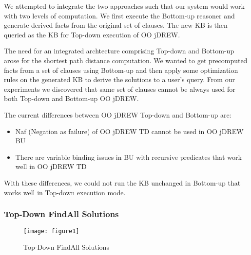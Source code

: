 \hspace{0.3in}We attempted to integrate the two approaches such that our system would work with two levels of computation. We first execute the Bottom-up reasoner and generate derived facts from the original set of clauses. The new KB is then queried as the KB for Top-down execution of OO jDREW.
 
The need for an integrated archtecture comprising Top-down and Bottom-up arose for the shortest path distance computation. We wanted to get precomputed facts from a set of clauses using Bottom-up and then apply some optimization rules on the generated KB to derive the solutions to a user's query. From our experiments we discovered that same set of clauses cannot be always used for both Top-down and Bottom-up OO jDREW.

\hspace{0.3in}The current differences between OO jDREW Top-down and Bottom-up are:
\begin{itemize}
\item Naf (Negation as failure) of OO jDREW TD cannot be used in OO jDREW BU
\item There are variable binding issues in BU with recursive predicates that work well in OO jDREW TD
\end{itemize}

\hspace{0.3in}With these differences, we could not run the KB unchanged in Bottom-up that works well in Top-down execution mode.


\subsubsection{Top-Down FindAll Solutions}

\begin{figure}
\begin{center}
\texttt{[image: figure1]}
\caption {Top-Down FindAll Solutions}
\label{fig:Fig1.1}
\end{center}
\end{figure} 

